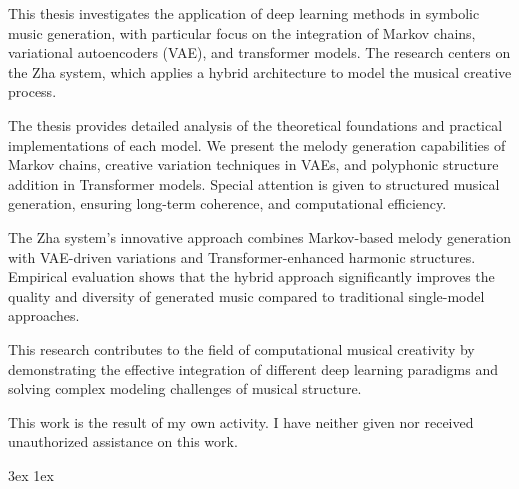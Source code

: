 \documentclass[final,12pt]{ubb_dolgozat}
\begin{document}

\maketitle

\begin{abstractEN}

This thesis investigates the application of deep learning methods in symbolic music generation, with particular focus on the integration of Markov chains, variational autoencoders (VAE), and transformer models. The research centers on the Zha system, which applies a hybrid architecture to model the musical creative process.

The thesis provides detailed analysis of the theoretical foundations and practical implementations of each model. We present the melody generation capabilities of Markov chains, creative variation techniques in VAEs, and polyphonic structure addition in Transformer models. Special attention is given to structured musical generation, ensuring long-term coherence, and computational efficiency.

The Zha system's innovative approach combines Markov-based melody generation with VAE-driven variations and Transformer-enhanced harmonic structures. Empirical evaluation shows that the hybrid approach significantly improves the quality and diversity of generated music compared to traditional single-model approaches.

This research contributes to the field of computational musical creativity by demonstrating the effective integration of different deep learning paradigms and solving complex modeling challenges of musical structure.
	
\vspace*{.5cm}

This work is the result of my own activity. I have neither given nor received unauthorized assistance on this work.

\end{abstractEN}


{ \baselineskip 3ex
  \parskip 1ex
  \tableofcontents
  \clearpage
  \listoffigures
  \clearpage
  \listoftables
  \clearpage
}
\end{document}
